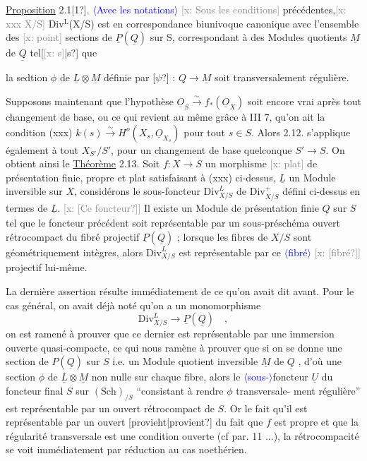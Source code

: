 \documentclass[11pt]{article}
\newcommand{\scanpage}[1]{\par\bigskip\noindent{\small\sffamily[scan #1]}\par}
\newcommand{\mspage}[1]{{\small\sffamily[p.\,#1]}}
\newcommand{\inserted}[2][]{\textcolor{blue}{$\langle$#2$\rangle$}}
\newcommand{\xout}[1]{\textcolor{gray}{[\textsf{x:} #1]}}
\newcommand{\uline}[1]{\underline{#1}}
\newcommand{\unsure}[1]{[#1?]}
\begin{document}
\uline{Proposition} 2.1\unsure{1}. \inserted[typed]{Avec les notations} \xout{Sous les conditions} précédentes,\xout{xxx X/S} Div$^{\mathrm{L}}$(X/S) est
en correspondance biunivoque canonique avec l'ensemble des \xout{point} sections
de $\underline{P}(\underline{Q})$ sur S, correspondant à des Modules quotients $\underline{M}$ de $\underline{Q}$ tel\unsure{\xout{s}|s} que

\mspage{110}

\clearpage
\scanpage{25/111}
\mspage{14}

la sedtion $\phi$ de $\underline{L}\otimes\underline{M}$ définie par \unsure{$\psi$} : $Q\longrightarrow\underline{M}$ soit transversalement
régulière.

Supposons maintenant que l'hypothèse $\underline{O}_S\xrightarrow{\sim}f_*(\underline{O}_X)$ soit encore vrai
après tout changement de base, ou ce qui revient au même grâce à III 7,
qu'on ait la condition
(xxx) \qquad\qquad $k(s)\xrightarrow{\sim}H^o(X_s,\underline{O}_{X_s})$
pour tout $s\in S$. Alors 2.12. s'applique également à tout $X_{S'}/S'$, pour un
changement de base quelconque $S'\rightarrow S$. On obtient ainsi le
\uline{Théorème} 2.13. Soit $f\colon X\longrightarrow S$ un morphisme \xout{plat} de présentation finie,
propre et plat satisfaisant à (xxx) ci-dessus, $\underline{L}$ un Module inversible
sur $X$, considérons le sous-foncteur $\mathrm{Div}^{L}_{X/S}$ de $\mathrm{Div}^{+}_{X/S}$ défini ci-dessus en
termes de $\underline{L}$. \xout{\unsure{Ce foncteur}} Il existe un Module de présentation finie $\underline{Q}$ sur
$S$ tel que le foncteur précédent soit représentable par un sous-préschéma
ouvert rétrocompact du fibré projectif $\underline{P}(\underline{Q})$ ; lorsque les fibres de $X/S$
sont géométriquement intègres, alors $\mathrm{Div}^{L}_{X/S}$ est représentable par ce
\inserted[typed]{fibré} \xout{\unsure{fibré}} projectif lui-même.

La dernière assertion résulte immédiatement de ce qu'on avait dit
avant. Pour le cas général, on avait déjà noté qu'on a un monomorphisme
\[
\mathrm{Div}^{L}_{X/S}\longrightarrow\underline{P}(\underline{Q}) \quad ,
\]
on est ramené à prouver que ce dernier est représentable par une immersion
ouverte quasi-compacte, ce qui nous ramène à prouver que si on se donne
une section de $P(\underline{Q})$ sur $S$ i.e. un Module quotient inversible $\underline{M}$ de $\underline{Q}$ ,
d'où une section $\phi$ de $\underline{L}\otimes\underline{M}$ non nulle sur chaque fibre, alors le \inserted{sous-}foncteur
$\underline{U}$ du foncteur final $S$ sur $(\mathrm{Sch})_{/S}$ ``consistant à rendre $\phi$ transversale-
ment régulière'' est représentable par un ouvert rétrocompact de $S$. Or
le fait qu'il est représentable par un ouvert \unsure{provieht|provient} du fait que $f$ est
propre et que la régularité transversale est une condition ouverte (cf par.
11 ...), la rétrocompacité se voit immédiatement par réduction au cas
noethérien.
\end{document}
